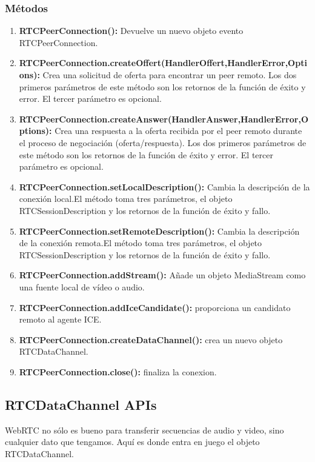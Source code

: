 \subsubsection*{Métodos}
\begin{enumerate}
  \item\textbf{RTCPeerConnection():} Devuelve un nuevo objeto evento RTCPeerConnection.
  \item\textbf{RTCPeerConnection.createOffert(HandlerOffert,HandlerError,Options):} Crea una solicitud de oferta para encontrar un peer remoto. Los dos primeros parámetros de este método son los retornos de la función de éxito y error. El tercer parámetro es opcional.
  \item \textbf{RTCPeerConnection.createAnswer(HandlerAnswer,HandlerError,Options):} Crea una respuesta a la oferta recibida por el peer remoto durante el proceso de negociación (oferta/respuesta). Los dos primeros parámetros de este método son los retornos de la función de éxito y error. El tercer parámetro es opcional.
  \item \textbf{RTCPeerConnection.setLocalDescription():} Cambia la descripción de la conexión local.El método toma tres parámetros, el objeto RTCSessionDescription y los retornos de la función de éxito y fallo.
  \item \textbf{RTCPeerConnection.setRemoteDescription():} Cambia la descripción de la conexión remota.El método toma tres parámetros, el objeto RTCSessionDescription y los retornos de la función de éxito y fallo.
  \item \textbf{RTCPeerConnection.addStream():} Añade un objeto MediaStream como una fuente local de vídeo o audio.
  \item \textbf{RTCPeerConnection.addIceCandidate():} proporciona un candidato remoto al agente ICE.
  \item \textbf{RTCPeerConnection.createDataChannel():} crea un nuevo objeto RTCDataChannel.
  \item \textbf{RTCPeerConnection.close():} finaliza la conexion.
\end{enumerate}
\subsection{RTCDataChannel APIs}
WebRTC no sólo es bueno para transferir secuencias de audio y video, sino cualquier dato que tengamos. Aquí es donde entra en juego el objeto RTCDataChannel.
